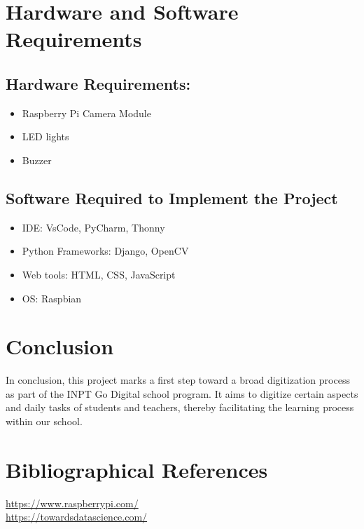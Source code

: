 \documentclass[11pt]{article}
\begin{document}
	\section{Hardware and Software Requirements}
	\subsection{Hardware Requirements:}
	\begin{itemize}
		\item Raspberry Pi Camera Module
		\item LED lights
		\item Buzzer
	\end{itemize}
	
	\subsection{Software Required to Implement the Project}
	\begin{itemize}
		\item IDE: VsCode, PyCharm, Thonny
		\item Python Frameworks: Django, OpenCV
		\item Web tools: HTML, CSS, JavaScript
		\item OS: Raspbian
	\end{itemize}
	
	\section{Conclusion}
	In conclusion, this project marks a first step toward a broad digitization process as part of the INPT Go Digital school program. It aims to digitize certain aspects and daily tasks of students and teachers, thereby facilitating the learning process within our school.
	
	\section{Bibliographical References}
	\href{https://www.raspberrypi.com/}{https://www.raspberrypi.com/}\\
	\href{https://towardsdatascience.com/real-time-face-recognition-an-end-to-end-project-b738bb0f7348}{https://towardsdatascience.com/}
	
\end{document}

